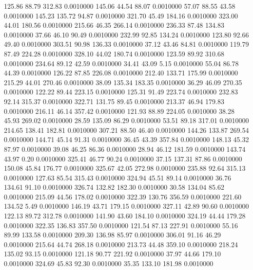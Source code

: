  125.86   88.79  312.83   0.0010000
 145.06   44.54   88.07   0.0010000
  57.07   88.55   43.58   0.0010000
 145.23  135.72   94.87   0.0010000
 321.70   45.49  184.16   0.0010000
 323.00   44.01  180.56   0.0010000
 215.66   46.35  266.14   0.0010000
 236.33   87.48  134.83   0.0010000
  37.66   46.10   90.49   0.0010000
 232.99   92.85  134.24   0.0010000
 123.80   92.66   49.40   0.0010000
 303.51   90.98  136.33   0.0010000
  37.12   43.46   84.81   0.0010000
 119.79   87.49  224.28   0.0010000
 328.10   44.02  180.74   0.0010000
 123.59   89.92  310.68   0.0010000
 234.64   89.12   42.59   0.0010000
  34.41   43.09    5.15   0.0010000
  55.04   86.78   44.39   0.0010000
 126.22   87.85  226.08   0.0010000
 212.40  133.71  175.99   0.0010000
 215.29   44.01  270.46   0.0010000
  38.09  135.34  183.35   0.0010000
  36.29   46.09  270.35   0.0010000
 122.22   89.44  223.15   0.0010000
 125.31   91.49  223.74   0.0010000
 232.83   92.14  315.37   0.0010000
 322.71  131.75   89.45   0.0010000
 213.37   46.94  179.83   0.0010000
 216.11   46.14  357.42   0.0010000
 121.93   88.89  224.05   0.0010000
  38.28   45.93  269.02   0.0010000
  28.59  135.09   86.29   0.0010000
  53.51   89.18  317.01   0.0010000
 214.65  138.41  182.81   0.0010000
 307.21   88.50   46.40   0.0010000
 144.26  133.87  269.54   0.0010000
 144.71   45.14   91.31   0.0010000
  36.45   43.39  357.84   0.0010000
 148.13   45.32   87.97   0.0010000
  39.08   46.25   86.36   0.0010000
  28.94   46.12  181.59   0.0010000
 143.74   43.97    0.20   0.0010000
 325.41   46.77   90.24   0.0010000
  37.15  137.31   87.86   0.0010000
 150.08   45.84  176.77   0.0010000
 325.67   42.05  272.98   0.0010000
 235.88   92.64  315.13   0.0010000
 127.63   85.54  315.43   0.0010000
 324.94   45.51   89.14   0.0010000
  36.76  134.61   91.10   0.0010000
 326.74  132.82  182.30   0.0010000
  30.58  134.04   85.62   0.0010000
 215.09   44.56  178.02   0.0010000
 322.39  130.76  356.59   0.0010000
 221.60  134.52    5.49   0.0010000
 146.19   43.71  179.15   0.0010000
 327.11   42.89   90.60   0.0010000
 122.13   89.72  312.78   0.0010000
 141.90   43.60  184.10   0.0010000
 324.19   44.44  179.28   0.0010000
 322.35  136.83  357.50   0.0010000
 121.54   87.13  227.91   0.0010000
  55.16   89.99  133.58   0.0010000
 209.30  136.98   85.97   0.0010000
 306.01   91.16   46.29   0.0010000
 215.64   44.74  268.18   0.0010000
 213.73   44.48  359.10   0.0010000
 218.24  135.02   93.15   0.0010000
 121.18   90.77  221.92   0.0010000
  37.97   44.66  179.10   0.0010000
 324.69   45.83   92.30   0.0010000
  35.35  133.10  181.98   0.0010000
